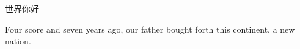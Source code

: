 \documentclass[]{guo}
\begin{document}


{\fontld 世界你好}

{\fontle Four} score and seven years ago, our father bought forth this
continent, a new nation.
\end{document}
